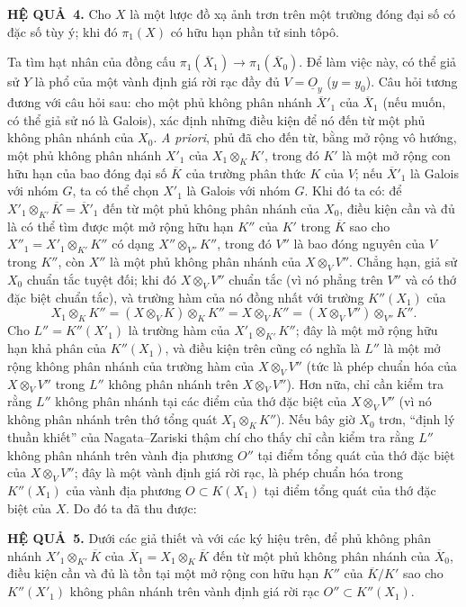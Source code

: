 \documentclass[11pt,twoside,openany]{book}
\numberwithin{equation}{section}
\newcommand{\src}[1]{%
  \phantomsection\hypertarget{src:\fgasourceid:#1}{}%
  \marginpar{\raggedleft\footnotesize\sffamily #1}%
}
\newcommand{\fgasourceid}{unset}
\newcommand{\Osh}{\underline{O}}
\newcommand{\result}[2]{\par\medskip\noindent\textbf{#1\if\relax\detokenize{#2}\relax\else\ #2\fi.}\quad}
\begin{document}
\result{HỆ QUẢ}{4} Cho $X$ là một lược đồ xạ ảnh trơn trên một trường đóng đại
số có đặc số tùy ý; khi đó $\pi_1(X)$ có hữu hạn phần tử sinh tôpô.

Ta tìm hạt nhân của đồng cấu
$\pi_1(\overline X_1)\longrightarrow\pi_1(\overline X_0)$. Để làm việc này,
có thể giả sử $Y$ là phổ của một vành định giá rời rạc đầy đủ
$V=\Osh_y$ ($y=y_0$). Câu hỏi tương đương với câu hỏi sau: cho một phủ không
phân nhánh $\overline X'_1$ của $\overline X_1$ (nếu muốn, có thể giả sử nó là
Galois), xác định những điều kiện để nó đến từ một phủ không phân nhánh của
$X_0$. \textit{A priori}, phủ đã cho đến từ, bằng mở rộng vô hướng, một phủ
không phân nhánh $X'_1$ của $X_1\otimes_K K'$, trong đó $K'$ là một mở rộng
con hữu hạn của bao đóng đại số $\overline K$ của trường phân thức $K$ của
$V$; nếu $\overline X'_1$ là Galois với nhóm $G$, ta có thể chọn $X'_1$ là
Galois với nhóm $G$. Khi đó ta có: để
$X'_1\otimes_{K'}\overline K=\overline X'_1$ đến từ một phủ không phân nhánh
của $X_0$, điều kiện cần và đủ là có thể tìm được một mở rộng hữu hạn $K''$
của $K'$ trong $\overline K$ sao cho
$X''_1=X'_1\otimes_{K'}K''$ có dạng $X''\otimes_{V''}K''$, trong đó $V''$ là
bao đóng nguyên của $V$ trong $K''$, còn $X''$ là một phủ không phân nhánh của
$X\otimes_VV''$. Chẳng hạn, giả sử $X_0$ chuẩn tắc tuyệt đối; khi đó
$X\otimes_VV''$ chuẩn tắc (vì nó phẳng trên $V''$ và có thớ đặc biệt chuẩn
tắc), và trường hàm của nó đồng nhất với trường $K''(X_1)$ của
\[
  X_1\otimes_KK''
  =(X\otimes_VK)\otimes_KK''
  =X\otimes_VK''
  =(X\otimes_VV'')\otimes_{V''}K''.
\]
Cho $L''=K''(X'_1)$ là trường hàm của
$X'_1\otimes_{K'}K''$; đây là một mở rộng hữu hạn khả phân của $K''(X_1)$, và
điều kiện trên cũng có nghĩa là $L''$ là một mở rộng không phân nhánh của
trường hàm của $X\otimes_VV''$ (tức là phép chuẩn hóa của
$X\otimes_VV''$ trong $L''$ không phân nhánh trên $X\otimes_VV''$). Hơn nữa,
chỉ cần kiểm tra rằng $L''$ không phân nhánh tại các điểm của thớ đặc biệt của
$X\otimes_VV''$ (vì nó không phân nhánh trên thớ tổng quát
$X_1\otimes_KK''$). Nếu bây giờ $X_0$ trơn, “định lý thuần khiết” của
Nagata--Zariski thậm chí cho thấy chỉ cần kiểm tra rằng $L''$ không phân nhánh
trên vành địa phương $O''$ tại điểm tổng quát của thớ đặc biệt của
$X\otimes_VV''$; đây là một vành định giá rời rạc, là phép chuẩn hóa trong
$K''(X_1)$ của vành địa phương $O\subset K(X_1)$ tại điểm tổng quát của thớ
đặc biệt của $X$. Do đó ta đã thu được:

\src{218}
\result{HỆ QUẢ}{5} Dưới các giả thiết và với các ký hiệu trên, để phủ không
phân nhánh $X'_1\otimes_{K'}\overline K$ của
$\overline X_1=X_1\otimes_K\overline K$ đến từ một phủ không phân nhánh của
$\overline X_0$, điều kiện cần và đủ là tồn tại một mở rộng con hữu hạn $K''$
của $\overline K/K'$ sao cho $K''(X'_1)$ không phân nhánh trên vành định giá
rời rạc $O''\subset K''(X_1)$.
\end{document}
